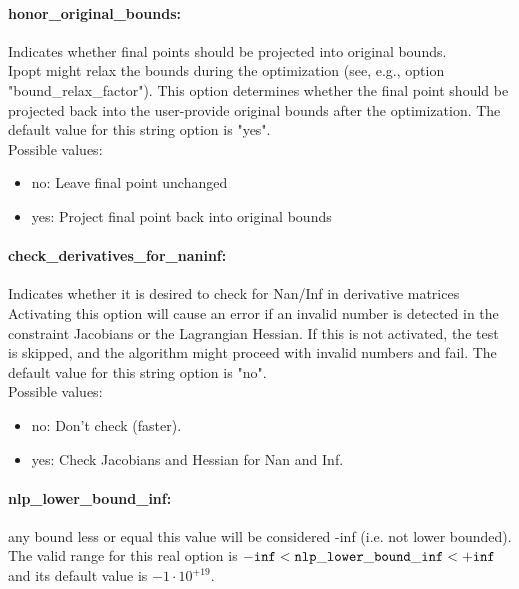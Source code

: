\paragraph{honor\_original\_bounds:}\label{sec:honor_original_bounds} Indicates whether final points should be projected into original bounds. $\;$ \\
 Ipopt might relax the bounds during the
optimization (see, e.g., option
"bound\_relax\_factor").  This option determines
whether the final point should be projected back
into the user-provide original bounds after the
optimization.
The default value for this string option is "yes".
\\ 
Possible values:
\begin{itemize}
   \item no: Leave final point unchanged
   \item yes: Project final point back into original bounds
\end{itemize}

\paragraph{check\_derivatives\_for\_naninf:}\label{sec:check_derivatives_for_naninf} Indicates whether it is desired to check for Nan/Inf in derivative matrices $\;$ \\
 Activating this option will cause an error if an
invalid number is detected in the constraint
Jacobians or the Lagrangian Hessian.  If this is
not activated, the test is skipped, and the
algorithm might proceed with invalid numbers and
fail.
The default value for this string option is "no".
\\ 
Possible values:
\begin{itemize}
   \item no: Don't check (faster).
   \item yes: Check Jacobians and Hessian for Nan and Inf.
\end{itemize}

\paragraph{nlp\_lower\_bound\_inf:}\label{sec:nlp_lower_bound_inf} any bound less or equal this value will be considered -inf (i.e. not lower bounded). $\;$ \\
 The valid range for this real option is 
${\tt -inf} <  {\tt nlp\_lower\_bound\_inf } <  {\tt +inf}$
and its default value is $-1 \cdot 10^{+19}$.


